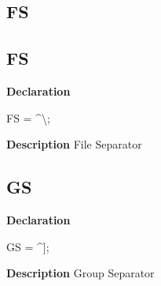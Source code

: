 \documentclass{report}
\newif\ifpdf
\begin{document}
\subsection*{\large{\textbf{FS}}\normalsize\hspace{1ex}\hrulefill}
\else
\subsection*{FS}
\fi
\label{ok_caret_character-FS}
\begin{list}{}{
\setlength{\itemindent}{0cm}
\setlength{\listparindent}{0cm}
\setlength{\leftmargin}{\evensidemargin}
\addtolength{\leftmargin}{\tmplength}
\settowidth{\labelsep}{X}
\addtolength{\leftmargin}{\labelsep}
\setlength{\labelwidth}{\tmplength}
}
\item[\textbf{Declaration}\hfill]
\ifpdf
\begin{flushleft}
\fi
\begin{ttfamily}
FS  = {\^{}}{\textbackslash};\end{ttfamily}

\ifpdf
\end{flushleft}
\fi

\par
\item[\textbf{Description}]
File Separator

\end{list}
\ifpdf
\subsection*{\large{\textbf{GS}}\normalsize\hspace{1ex}\hrulefill}
\else
\subsection*{GS}
\fi
\label{ok_caret_character-GS}
\begin{list}{}{
\setlength{\itemindent}{0cm}
\setlength{\listparindent}{0cm}
\setlength{\leftmargin}{\evensidemargin}
\addtolength{\leftmargin}{\tmplength}
\settowidth{\labelsep}{X}
\addtolength{\leftmargin}{\labelsep}
\setlength{\labelwidth}{\tmplength}
}
\item[\textbf{Declaration}\hfill]
\ifpdf
\begin{flushleft}
\fi
\begin{ttfamily}
GS  = {\^{}}];\end{ttfamily}

\ifpdf
\end{flushleft}
\fi

\par
\item[\textbf{Description}]
Group Separator

\end{list}
\ifpdf
\end{document}
